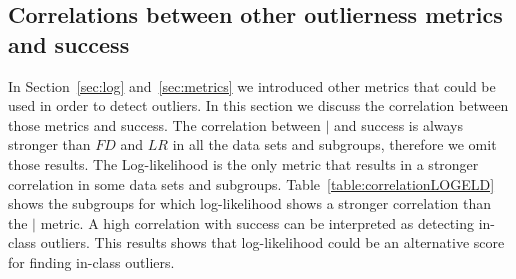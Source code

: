 {%




\subsection{Correlations between other outlierness metrics and success} \label{sec:corr-others}
In Section~\ref{sec:log} and~\ref{sec:metrics} we introduced other metrics that could be used in order to detect outliers. In this section we discuss the correlation between those metrics and success. The correlation between $\mid$ and success is always stronger than $\textit{FD}$ and $\textit{LR}$ in all the data sets and subgroups, therefore we omit those results. The Log-likelihood is the only metric that results in a stronger correlation in some data sets and subgroups. Table~\ref{table:correlationLOGELD} shows the subgroups for which log-likelihood shows a stronger correlation than the $\mid$ metric. 
A high correlation with success can be interpreted as detecting in-class outliers. This results shows that log-likelihood could be an alternative score for finding in-class outliers.
		\begin{table}

			\centering
\end{table}}

